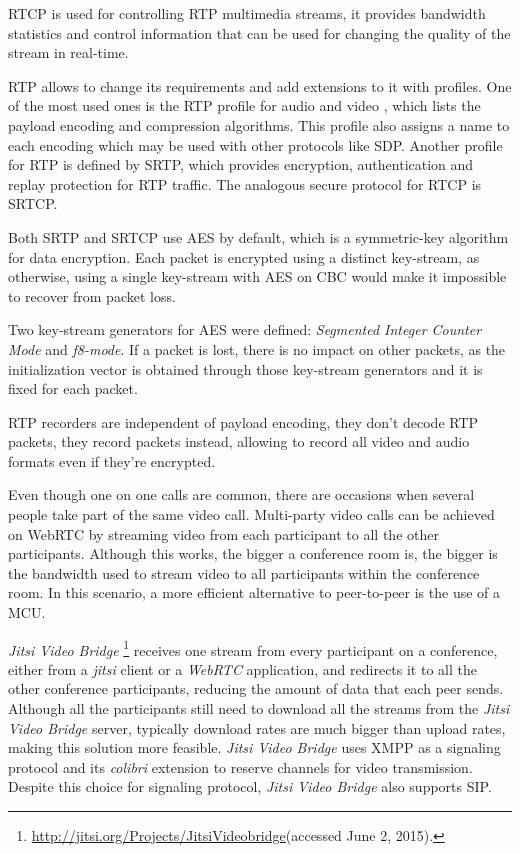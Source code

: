 \ac{RTCP} is used for controlling \ac{RTP} multimedia streams, it provides bandwidth statistics and control information that can be used for changing the quality of the stream in real-time.

  \ac{RTP} allows to change its requirements and add extensions to it with profiles. One of the most used ones is the \ac{RTP} profile for audio and video \cite{rfc3551}, which lists the payload encoding and compression algorithms. This profile also assigns a name to each encoding which may be used with other protocols like \ac{SDP}.
  Another profile for \ac{RTP} is defined by \ac{SRTP}, which provides encryption, authentication and replay protection for \ac {RTP} traffic. The analogous secure protocol for \ac{RTCP} is \ac{SRTCP}.

  Both \ac{SRTP} and \ac{SRTCP} use \ac{AES} by default, which is a symmetric-key algorithm for data encryption. Each packet is encrypted using a distinct key-stream, as otherwise, using a single key-stream with \ac{AES} on \ac{CBC} would make it impossible to recover from packet loss.

  Two key-stream generators for \ac{AES} were defined: \emph{Segmented Integer Counter Mode} and \emph{f8-mode}. If a packet is lost, there is no impact on other packets, as the initialization vector is obtained through those key-stream generators and it is fixed for each packet.


  \ac{RTP} recorders are independent of payload encoding, they don't decode \ac{RTP} packets, they record packets instead, allowing to record all video and audio formats even if they're encrypted.

        Even though one on one calls are common, there are occasions when several people take part of the same video call.
	Multi-party video calls can be achieved on \ac{WebRTC} by streaming video from each participant to all the other participants. Although this works, the bigger a conference room is, the bigger is the bandwidth used to stream video to all participants within the conference room.
        In this scenario, a more efficient alternative to peer-to-peer is the use of a \ac{MCU}.

	\emph{Jitsi Video Bridge} \footnote{\url{http://jitsi.org/Projects/JitsiVideobridge}(accessed June 2, 2015).} receives one stream from every participant on a conference, either from a \emph{jitsi} client or a \emph{WebRTC} application, and redirects it to all the other conference participants, reducing the amount of data that each peer sends. Although all the participants still need to download all the streams from the \emph{Jitsi Video Bridge} server, typically download rates are much bigger than upload rates, making this solution more feasible.
	\emph{Jitsi Video Bridge} uses \ac{XMPP} as a signaling protocol and its \emph{colibri} extension \cite{xep0340} to reserve channels for video transmission. Despite this choice for signaling protocol, \emph{Jitsi Video Bridge} also supports \ac{SIP}.

